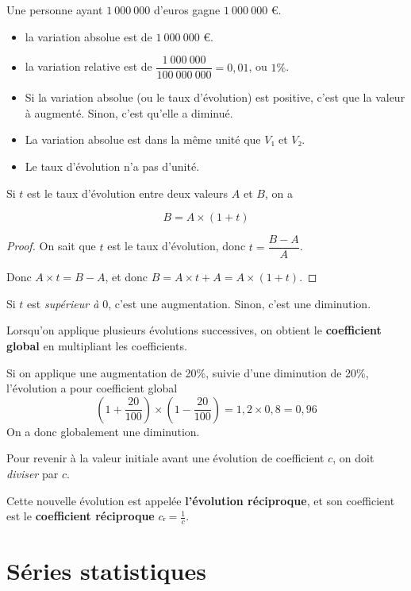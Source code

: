 \documentclass[
	classe=$2^{de}$
]{coursclass}
\begin{document}
\begin{exemple}
	Une personne ayant $1\ 000\ 000$ d'euros gagne $1\ 000\ 000$ €.

	\begin{itemize}
		\item la variation absolue est de $1\ 000\ 000$ €.
		\item la variation relative est de $\dfrac{1\ 000\ 000}{100\ 000\ 000} = 0,01$, ou $1\%$.
	\end{itemize}
\end{exemple}

\begin{remarque}
	\begin{itemize}
		\item Si la variation absolue (ou le taux d'évolution) est positive, c'est que la valeur à augmenté. Sinon, c'est qu'elle a diminué.
		\item La variation absolue est dans la même unité que $V₁$ et $V₂$.
		\item Le taux d'évolution n'a pas d'unité.
	\end{itemize}
\end{remarque}

\begin{propriete}
	Si $t$ est le taux d'évolution entre deux valeurs $A$ et $B$, on a

	$$ B = A × (1 + t) $$
\end{propriete}
\begin{proof}
	On sait que $t$ est le taux d'évolution, donc $t = \dfrac{B - A}{A}$.

	Donc $A × t = B - A$, et donc
	$B = A × t + A = A × (1 + t)$.
\end{proof}

\begin{remarque}
	Si $t$ est \textit{supérieur à $0$}, c'est une augmentation. Sinon, c'est une diminution.
\end{remarque}

\begin{propriete}
	Lorsqu'on applique plusieurs évolutions successives, on obtient le \textbf{coefficient global} en multipliant les coefficients.
\end{propriete}
\begin{exemple}
	Si on applique une augmentation de 20\%, suivie d'une diminution de 20\%, l'évolution a pour coefficient global
	$$ \left(1 + \frac{20}{100}\right) × \left(1 - \frac{20}{100}\right) = 1,2 × 0,8 = 0,96 $$
	On a donc globalement une diminution.
\end{exemple}

\begin{propriete}
	Pour revenir à la valeur initiale avant une évolution de coefficient $c$, on doit \textit{diviser} par $c$.

	Cette nouvelle évolution est appelée \textbf{l'évolution réciproque}, et son coefficient est le \textbf{coefficient réciproque} $cᵣ = \frac{1}{c}$.
\end{propriete}

\section{Séries statistiques}
\end{document}
